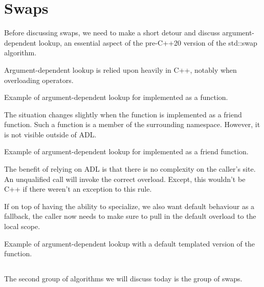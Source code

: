 \section{Swaps}

Before discussing swaps, we need to make a short detour and discuss argument-dependent lookup, an essential aspect of the pre-C++20 version of the std::swap algorithm.

Argument-dependent lookup is relied upon heavily in C++, notably when overloading operators.

\begin{box-note}
\footnotesize Example of argument-dependent lookup for  implemented as a function.
\tcblower
{}
\end{box-note}

The situation changes slightly when the function is implemented as a friend function. Such a function is a member of the surrounding namespace. However, it is not visible outside of ADL.

\begin{box-note}
\footnotesize Example of argument-dependent lookup for  implemented as a friend function.
\tcblower
{}
\end{box-note}

The benefit of relying on ADL is that there is no complexity on the caller's site. An unqualified call will invoke the correct overload. Except, this wouldn't be C++ if there weren't an exception to this rule.

If on top of having the ability to specialize, we also want default behaviour as a fallback, the caller now needs to make sure to pull in the default overload to the local scope.

\begin{box-note}
\footnotesize Example of argument-dependent lookup with a default templated version of the function.
\tcblower
{}
\end{box-note}

\subsection{\texorpdfstring{}{\texttt{std::swap}}}

The second group of algorithms we will discuss today is the group of swaps.


